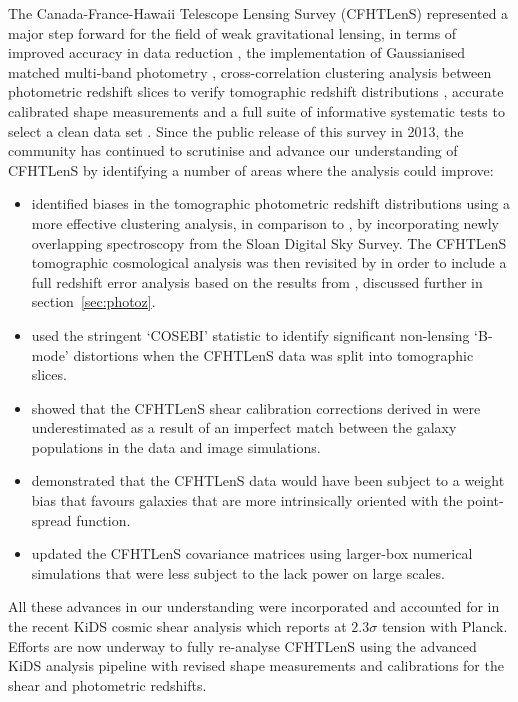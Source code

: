 The Canada-France-Hawaii Telescope Lensing Survey (CFHTLenS) represented a major step forward for the field of weak gravitational lensing, in terms of improved accuracy in data reduction \citep{erben/etal:2013}, the implementation of Gaussianised matched multi-band photometry \citep{hildebrandt/etal:2012}, cross-correlation clustering analysis between photometric redshift slices to verify tomographic redshift distributions \citep{benjamin/etal:2013}, accurate calibrated shape measurements \citep{miller/etal:2013} and a full suite of informative systematic tests to select a clean data set \citep{heymans/etal:2012}.    Since the public release of this survey in 2013, the community has continued to scrutinise and advance our understanding of CFHTLenS by identifying a number of areas where the analysis could improve:
\begin{itemize}
\item{\citet{choi/etal:2016} identified biases in the tomographic photometric redshift distributions using a more effective clustering analysis, in comparison to \citet{benjamin/etal:2013}, by incorporating newly overlapping spectroscopy from the Sloan Digital Sky Survey.  The CFHTLenS tomographic cosmological analysis was then revisited by \citet{joudaki/etal:2016} in order to include a full redshift error analysis based on the results from \citet{choi/etal:2016}, discussed further in section~\ref{sec:photoz}.}
\item{\citet{asgari/etal:2016} used the stringent `COSEBI' statistic to identify significant non-lensing `B-mode' distortions when the CFHTLenS data was split into tomographic slices.}
\item{\citet{kuijken/etal:2015} showed that the CFHTLenS shear calibration corrections derived in \citet{miller/etal:2013} were underestimated as a result of an imperfect match between the galaxy populations in the data and image simulations.}
\item{\citet{fenechconti/etal:2016} demonstrated that the CFHTLenS data would have been subject to a weight bias that favours galaxies that are more intrinsically oriented with the point-spread function.}
\item{\citet{joudaki/etal:2016} updated the CFHTLenS covariance matrices using larger-box numerical simulations that were less subject to the lack power on large scales.}
\end{itemize}
All these advances in our understanding were incorporated and accounted for in the recent KiDS cosmic shear analysis \citep{hildebrandt/etal:2016} which reports at $2.3 \sigma$ tension with Planck.  Efforts are now underway to fully re-analyse CFHTLenS using the advanced KiDS analysis pipeline with revised shape measurements and calibrations for the shear and photometric redshifts.  

